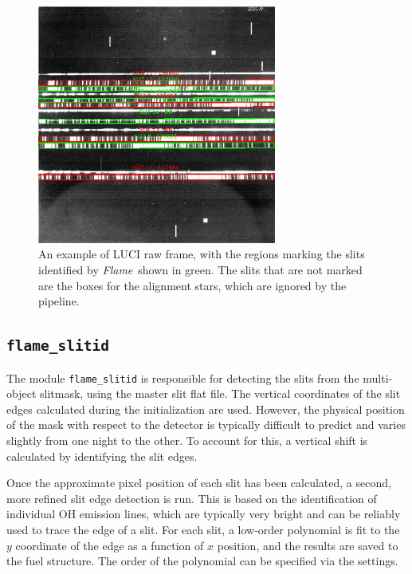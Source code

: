 \documentclass[a4paper]{article}
\newcommand{\flame}{\emph{Flame}}
\begin{document}
\begin{sloppypar}
\begin{figure}[htbp]
\centering
\includegraphics[width=0.7\textwidth]{slits}
\caption{An example of LUCI raw frame, with the regions marking the slits identified by \flame\ shown in green. The slits that are not marked are the boxes for the alignment stars, which are ignored by the pipeline.}
\label{fig:slits}
\end{figure}

\subsection{\texttt{flame\_slitid}}
\label{sec:slitid}

The module \texttt{flame\_slitid} is responsible for detecting the slits from the multi-object slitmask, using the master slit flat file. The vertical coordinates of the slit edges calculated during the initialization are used. However, the physical position of the mask with respect to the detector is typically difficult to predict and varies slightly from one night to the other. To account for this, a vertical shift is calculated by identifying the slit edges.

Once the approximate pixel position of each slit has been calculated, a second, more refined slit edge detection is run. This is based on the identification of individual OH emission lines, which are typically very bright and can be reliably used to trace the edge of a slit. For each slit, a low-order polynomial is fit to the $y$ coordinate of the edge as a function of $x$ position, and the results are saved to the fuel structure. The order of the polynomial can be specified via the settings.


\end{sloppypar}
\end{document}
